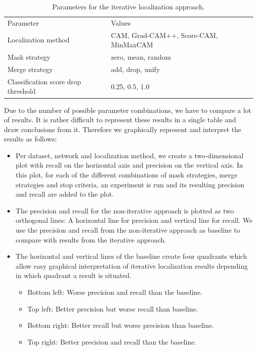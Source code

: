 \begin{table}[ht]
\centering
\begin{tabular}{ll}
\toprule
Parameter & Values\\
\cmidrule(lr){1-2}
Localization method & CAM, Grad-CAM++, Score-CAM, MinMaxCAM \\
Mask strategy & zero, mean, random \\
Merge strategy & add, drop, unify \\
Classification score drop threshold & 0.25, 0.5, 1.0 \\
\bottomrule
\end{tabular}
\caption[Parameters for the iterative localization approach]{Parameters for the iterative localization approach.}
\label{tab:iterative_localizaton_parameters}
\end{table}

 Due to the number of possible parameter combinations, we have to compare a lot of results. It is rather difficult to represent these results in a single table and draw conclusions from it. Therefore we graphically represent and interpret the results as follows:
\begin{itemize}
    \item Per dataset, network and localization method, we create a two-dimensional plot with recall on the horizontal axis and precision on the vertical axis. In this plot, for each of the different combinations of mask strategies, merge strategies and stop criteria, an experiment is run and its resulting precision and recall are added to the plot.
    \item The precision and recall for the non-iterative approach is plotted as two orthogonal lines: A horizontal line for precision and vertical line for recall. We use the precision and recall from the non-iterative approach as baseline to compare with results from the iterative approach.
    \item The horizontal and vertical lines of the baseline create four quadrants which allow easy graphical interpretation of iterative localization results depending in which quadrant a result is situated.
    \begin{itemize}
        \item Bottom left: Worse precision and recall than the baseline.
        \item Top left: Better precision but worse recall than baseline.
        \item Bottom right: Better recall but worse precision than baseline.
        \item Top right: Better precision and recall than the baseline.
    \end{itemize}
\end{itemize}


